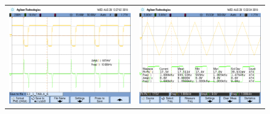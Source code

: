 \begin{figure}[H]
	\centering
	\begin{tabular}{c c}
		\includegraphics[scale=0.2]{../EJ4/Derivador/Mediciones/Osciloscopio/PCB_Compensado/EJ_1_TABLA_6.png} &
		\includegraphics[scale=0.2]{../EJ4/Derivador/Mediciones/Osciloscopio/PCB_Compensado/osc_4.png} \\

\end{tabular}
\end{figure}
